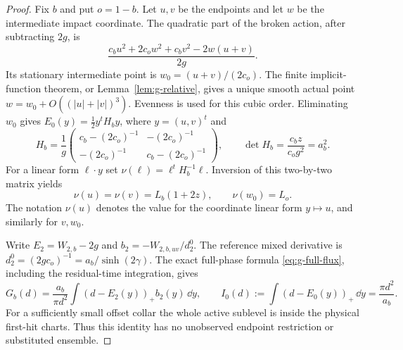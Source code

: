 \begin{proof}
Fix $b$ and put $o=1-b$. Let $u,v$ be the endpoints and let $w$ be
the intermediate impact coordinate. The quadratic part of the broken
action, after subtracting $2g$, is
\[
 \frac{c_bu^2+2c_ow^2+c_bv^2-2w(u+v)}{2g}.
\]
Its stationary intermediate point is $w_0=(u+v)/(2c_o)$.
The finite implicit-function theorem, or Lemma~\ref{lem:g-relative},
gives a unique smooth actual point $w=w_0+O((|u|+|v|)^3)$.
Evenness is used for this cubic order. Eliminating $w_0$ gives
$E_0(y)=\tfrac12 y^tH_by$, where $y=(u,v)^t$ and
\begin{equation}\label{eq:v13-schur}
 H_b=\frac1g\begin{pmatrix}
 c_b-(2c_o)^{-1}&-(2c_o)^{-1}\\
 -(2c_o)^{-1}&c_b-(2c_o)^{-1}
 \end{pmatrix},\qquad
 \det H_b=\frac{c_bz}{c_og^2}=a_b^2.
\end{equation}
For a linear form $\ell\cdot y$ set $\nu(\ell)=\ell^tH_b^{-1}\ell$.
Inversion of this two-by-two matrix yields
\begin{equation}\label{eq:v13-variances}
 \nu(u)=\nu(v)=L_b(1+2z),\qquad \nu(w_0)=L_o.
\end{equation}
The notation $\nu(u)$ denotes the value for the coordinate linear
form $y\mapsto u$, and similarly for $v,w_0$.

Write $E_2=W_{2,b}-2g$ and $b_2=-W_{2,b,uv}/d_2^0$. The reference
mixed derivative is $d_2^0=(2gc_o)^{-1}=a_b/\sinh(2\gamma)$.
The exact full-phase formula \eqref{eq:g-full-flux}, including the
residual-time integration, gives
\begin{equation}\label{eq:v13-physical-integral}
 G_b(d)=\frac{a_b}{\pi d^2}\int(d-E_2(y))_+b_2(y)\,\dd y,
 \qquad I_0(d):=\int(d-E_0(y))_+\,\dd y=\frac{\pi d^2}{a_b}.
\end{equation}
For a sufficiently small offset collar the whole active sublevel is
inside the physical first-hit charts. Thus this identity has no
unobserved endpoint restriction or substituted ensemble.


\end{proof}
